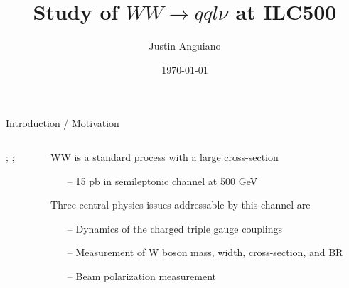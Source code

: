 \documentclass[10pt]{beamer}
\author{Justin Anguiano}
\title{Study of $WW\rightarrow qql\nu$ at ILC500}
\date{\today}
\begin{document}
\maketitle



\begin{frame}{Introduction / Motivation}

\begin{columns}
\begin{column}{0.5\textwidth}
;
    ;
\end{column}
\begin{column}{0.5\textwidth}
	WW is a standard process with a large cross-section 
		\begin{itemize}
		\scriptsize
		\item[--] 15 pb in semileptonic channel at 500 GeV
		\end{itemize} 
	Three central physics issues addressable by this channel are
		\begin{itemize}
		\scriptsize
		\item[--] Dynamics of the charged triple gauge couplings
		\item[--] Measurement of W boson mass, width, cross-section, and BR
		\item[--] Beam polarization measurement
		
		\end{itemize}
\end{column}
\end{columns}

\end{frame}
\end{document}
